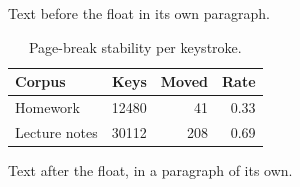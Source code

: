 \documentclass[12pt]{article}
\begin{document}
Text before the float in its own paragraph.

\begin{table}[t]
  \centering
  \caption{Page-break stability per keystroke.}
  \label{tab:s}
  \begin{tabular}{lrrr}
    \toprule
    Corpus & Keys & Moved & Rate \\
    \midrule
    Homework & 12480 & 41 & 0.33 \\
    Lecture notes & 30112 & 208 & 0.69 \\
    \bottomrule
  \end{tabular}
\end{table}

Text after the float, in a paragraph of its own.
\end{document}
